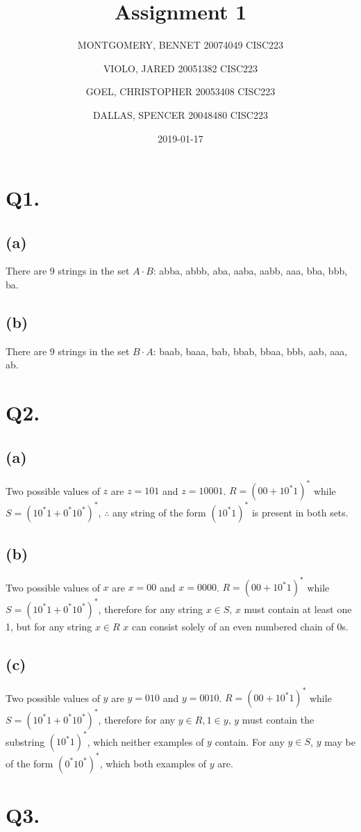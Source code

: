 \documentclass{article}
\title{Assignment 1}
\date{2019-01-17}
\author{MONTGOMERY, BENNET 20074049 CISC223\\
			\and VIOLO, JARED 20051382 CISC223\\
			\and GOEL, CHRISTOPHER 20053408 CISC223\\
			\and DALLAS, SPENCER 20048480 CISC223}
\begin{document}
	\maketitle
	\thispagestyle{headings}
	
	\section*{Q1.}
	\subsection*{(a)}
	There are 9 strings in the set $A \cdot B$: abba, abbb, aba, aaba, aabb, aaa, bba, bbb, ba.
	\subsection*{(b)}
	There are 9 strings in the set $B \cdot A$: baab, baaa, bab, bbab, bbaa, bbb, aab, aaa, ab.
	
	\section*{Q2.}
	\subsection*{(a)}
	Two possible values of $z$ are $z = 101$ and $z = 10001$. $R = (00 + 10^*1)^*$ while $S = (10^*1 + 0^*10^*)^*$, $\therefore$ any string of the form $(10^*1)^*$ is present in both sets.
	\subsection*{(b)}
	Two possible values of $x$ are $x = 00$ and $x = 0000$. $R = (00 + 10^*1)^*$ while $S = (10^*1 + 0^*10^*)^*$, therefore for any string $x \in S$, $x$ must contain at least one 1, but for any string $x \in R$ $x$ can consist solely of an even numbered chain of 0s.
	\subsection*{(c)}
	Two possible values of $y$ are $y = 010$ and $y = 0010$. $R = (00 + 10^*1)^*$ while $S = (10^*1 + 0^*10^*)^*$, therefore for any $y \in R, 1 \in y$, $y$ must contain the substring $(10^*1)^*$, which neither examples of $y$ contain. For any $y \in S$, $y$ may be of the form $(0^*10^*)^*$, which both examples of $y$ are.
	
	\section*{Q3.}
\end{document}

